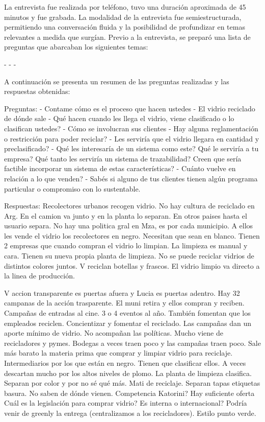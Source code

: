 La entrevista fue realizada por teléfono, tuvo una duración aproximada de 45 minutos y fue grabada. La modalidad de la entrevista fue semiestructurada, permitiendo una conversación fluida y la posibilidad de profundizar en temas relevantes a medida que surgían. Previo a la entrevista, se preparó una lista de preguntas que abarcaban los siguientes temas:

-
- 
-

A continuación se presenta un resumen de las preguntas realizadas y las respuestas obtenidas:

Preguntas:
- Contame cómo es el proceso que hacen ustedes
- El vidrio reciclado de dónde sale
- Qué hacen cuando les llega el vidrio, viene clasificado o lo clasifican ustedes?
- Cómo se involucran sus clientes
- Hay alguna reglamentación o restricción para poder reciclar?
- Les serviría que el vidrio llegara en cantidad y preclasificado?
- Qué les interesaría de un sistema como este? Qué le serviría a tu empresa? Qué tanto les serviría un sistema de trazabilidad? Creen que sería factible incorporar un sistema de estas características?
- Cuánto vuelve en relación a lo que venden?
- Sabés si alguno de tus clientes tienen algún programa particular o compromiso con lo sustentable.

Respuestas:
Recolectores urbanos recogen vidrio.
No hay cultura de reciclado en Arg.
En el camion va junto y en la planta lo separan.
En otros paises hasta el usuario separa.
No hay una politica gral en Mza, es por cada municipio.
A ellos les vende el vidrio los recolectores en negro. Necesitan que sean en blanco. Tienen 2 empresas que cuando compran el vidrio lo limpian. La limpieza es manual y cara. Tienen su nueva propia planta de limpieza.
No se puede reciclar vidrios de distintos colores juntos.
V reciclan botellas y frascos. 
El vidrio limpio va directo a la linea de producción.

V accion transparente es puertas afuera y Lucia es puertas adentro. Hay 32 campanas de la acción trasparente. El muni retira y ellos compran y reciben.
Campañas de entradas al cine.
3 o 4 eventos al año. 
También fomentan que los empleados reciclen.
Concientizar y fomentar el reciclado.
Las campañas dan un aporte mínimo de vidrio.
No acompañan las políticas. 
Mucho viene de recicladores y pymes. Bodegas a veces traen poco y las campañas traen poco.
Sale más barato la materia prima que comprar y limpiar vidrio para reciclaje.
Intermediarios por los que están en negro.
Tienen que clasificar ellos. A veces descartan mucho por los altos niveles de plomo.
La planta de limpieza clasifica. Separan por color y por no sé qué más. Mati de reciclaje. Separan tapas etiquetas basura. No saben de dónde vienen. Competencia Katorini? 
Hay suficiente oferta
Cuál es la legislación para comprar vidrio? Es interna o internacional? Podría venir de greenly la entrega (centralizamos a los recicladores). Estilo punto verde.

